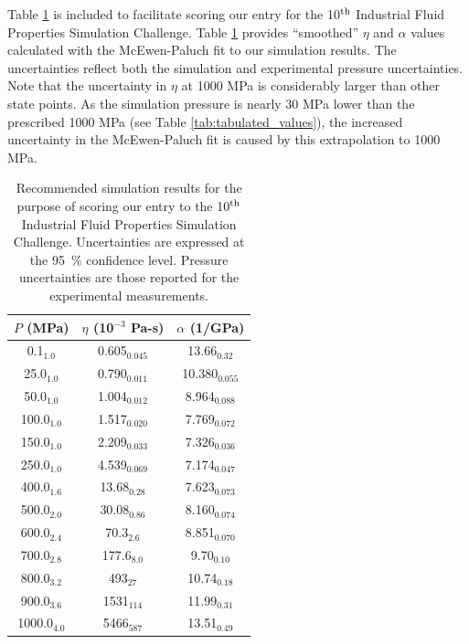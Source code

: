 \documentclass[preprint,review,12pt]{elsarticle}
\begin{document}
	Table \ref{tab:smoothed_values} is included to facilitate scoring our entry for the 10$^{\rm th}$ Industrial Fluid Properties Simulation Challenge. Table \ref{tab:smoothed_values} provides ``smoothed'' $\eta$ and $\alpha$ values calculated with the McEwen-Paluch fit to our simulation results. The uncertainties reflect both the simulation and experimental pressure uncertainties. Note that the uncertainty in $\eta$ at 1000 MPa is considerably larger than other state points. As the simulation pressure is nearly 30 MPa lower than the prescribed 1000 MPa (see Table \ref{tab:tabulated_values}), the increased uncertainty in the McEwen-Paluch fit is caused by this extrapolation to 1000 MPa.
	
	\begin{table}[htb!]
		\caption{Recommended simulation results for the purpose of scoring our entry to the 10$^{\rm th}$ Industrial Fluid Properties Simulation Challenge. Uncertainties are expressed at the 95~\% confidence level. Pressure uncertainties are those reported for the experimental measurements.} \label{tab:smoothed_values}
		\begin{center}
			\begin{tabular}{|c|c|c|}
				\hline
				$P$ (MPa) & 	$\eta$ (10$^{-3}$ Pa-s) & 	$\alpha$ (1/GPa) \\ \hline
				0.1$_{1.0}$ & 	0.605$_{0.045}$ & 	13.66$_{0.32}$ \\
				25.0$_{1.0}$ & 	0.790$_{0.011}$ & 	10.380$_{0.055}$ \\
				50.0$_{1.0}$ & 	1.004$_{0.012}$ & 	8.964$_{0.088}$ \\
				100.0$_{1.0}$ & 	1.517$_{0.020}$ & 	7.769$_{0.072}$ \\
				150.0$_{1.0}$ & 	2.209$_{0.033}$ & 	7.326$_{0.036}$ \\
				250.0$_{1.0}$ & 	4.539$_{0.069}$ & 	7.174$_{0.047}$ \\
				400.0$_{1.6}$ & 	13.68$_{0.28}$ & 	7.623$_{0.073}$ \\
				500.0$_{2.0}$ & 	30.08$_{0.86}$ & 	8.160$_{0.074}$ \\
				600.0$_{2.4}$ & 	70.3$_{2.6}$ & 	8.851$_{0.070}$ \\
				700.0$_{2.8}$ & 	177.6$_{8.0}$ & 	9.70$_{0.10}$ \\
				800.0$_{3.2}$ & 	493$_{27}$ & 	10.74$_{0.18}$ \\
				900.0$_{3.6}$ & 	1531$_{114}$ & 	11.99$_{0.31}$ \\
				1000.0$_{4.0}$ & 	5466$_{587}$ & 	13.51$_{0.49}$ \\
				\hline
			\end{tabular}
		\end{center} 
	\end{table} 
	
\end{document}
